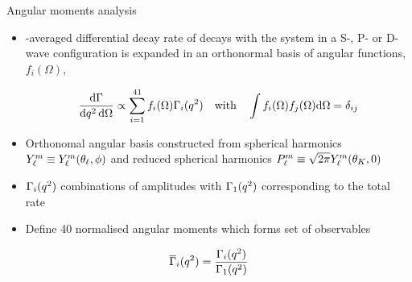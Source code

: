 \documentclass[aspectratio=1610]{beamer}
\begin{document}
\begin{frame}{Angular moments analysis}
\begin{itemize}
\item \CP-averaged differential decay rate of \BdToKpimm decays with the \Kp\pim system in a S-, P- or D-wave configuration is expanded in an orthonormal basis of angular functions, $f_i(\Omega)$, %

\begin{equation*}
\frac{\mathrm{d}\Gamma }{\mathrm{d}{q^2}\,\mathrm{d}\Omega} \propto \sum^{41}_{i=1} f_i (\Omega) \Gamma_i({q^2})
\quad\mbox{with}\quad
\int f_i(\Omega) f_j(\Omega) \mathrm{d}\Omega = \delta_{ij}
\end{equation*}

\medskip

\item Orthonomal angular basis constructed from spherical harmonics $Y^m_\ell \equiv Y^m_\ell (\theta_\ell,\phi)$ and reduced spherical harmonics ${P^m_\ell \equiv \sqrt{2 \pi}Y^m_\ell(\theta_K,0)}$
\item $\Gamma_i({q^2})$ combinations of \KstarJ amplitudes with $\Gamma_{1}({q^2})$ corresponding to the total rate
\item Define 40 normalised angular moments which forms set of observables
\end{itemize}
\begin{equation*}
\overline{\Gamma}_i({q^2}) = \frac{\Gamma_{i}({q^2})}{\Gamma_{1}({q^2})}
\end{equation*}

\end{frame}
\end{document}
